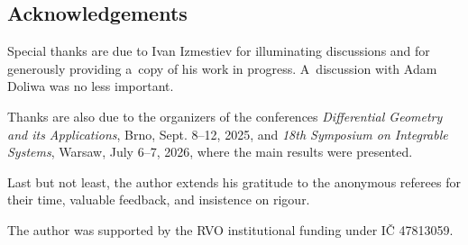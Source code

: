 \documentclass[pdftex]{sigma}
\numberwithin{equation}{section}
\theoremstyle{definition}
\begin{document}
\subsection*{Acknowledgements}

Special thanks are due to Ivan Izmestiev for illuminating discussions
and for generously providing a~copy of his work in progress. A~discussion with Adam Doliwa was no less important.

Thanks are also due to the organizers of the conferences
{\it Differential Geometry and its Applications}, Brno, Sept. 8--12, 2025,
and
{\it 18th Symposium on Integrable Systems}, Warsaw, July 6--7, 2026,
where the main results were presented.

Last but not least, the author extends his gratitude to the anonymous
referees for their time, valuable feedback, and insistence on rigour.

The author was supported by the RVO institutional funding under
I\v{C} 47813059.


\end{document}
